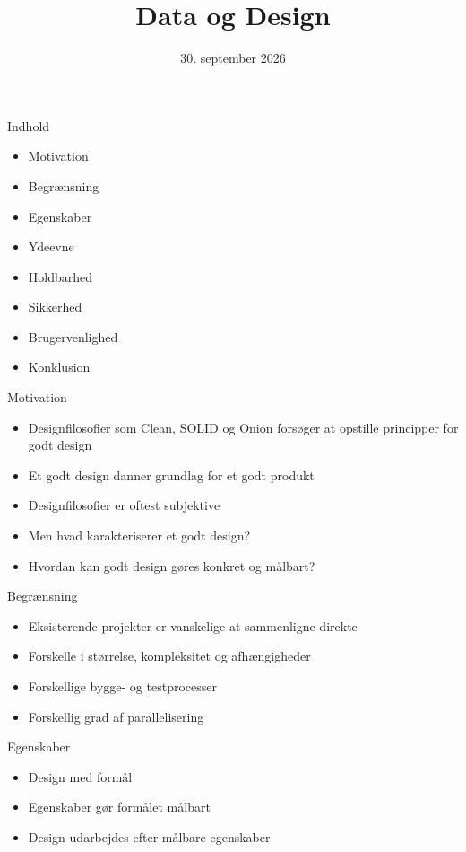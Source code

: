 \documentclass{beamer}
\title{Data og Design}
\author{\student}
\date{30. september 2026}
\begin{document}
\begin{frame}
  \titlepage
\end{frame}

\begin{frame}{Indhold}
  \begin{itemize}
    \item Motivation
    \item Begrænsning
    \item Egenskaber
    \item Ydeevne
    \item Holdbarhed
    \item Sikkerhed
    \item Brugervenlighed
    \item Konklusion
  \end{itemize}
\end{frame}

\begin{frame}{Motivation}
  \begin{itemize}
    \item Designfilosofier som Clean, SOLID og Onion forsøger at opstille principper
    for godt design

    \item Et godt design danner grundlag for et godt produkt
    \item Designfilosofier er oftest subjektive
    \item Men hvad karakteriserer et godt design?
    \item Hvordan kan godt design gøres konkret og målbart?
  \end{itemize}
\end{frame}

\begin{frame}{Begrænsning}
  \begin{itemize}
    \item Eksisterende projekter er vanskelige at sammenligne direkte
    \item Forskelle i størrelse, kompleksitet og afhængigheder
    \item Forskellige bygge- og testprocesser
    \item Forskellig grad af parallelisering
  \end{itemize}
\end{frame}

\begin{frame}{Egenskaber}
  \begin{itemize}
    \item Design med formål
    \item Egenskaber gør formålet målbart
    \item Design udarbejdes efter målbare egenskaber
  \end{itemize}
\end{frame}
\end{document}
